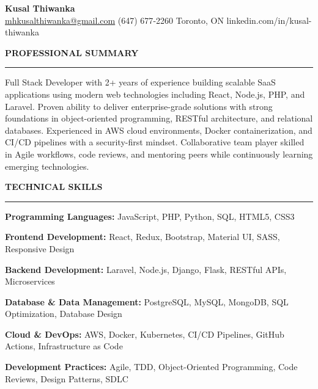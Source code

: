\documentclass[10pt,letterpaper]{article}
\begin{document}
\begin{center}
{\LARGE\textbf{Kusal Thiwanka}}\\[3pt]
\href{mailto:mhkusalthiwanka@gmail.com}{mhkusalthiwanka@gmail.com}\hspace{2em}%
(647) 677{-}2260\hspace{2em}%
Toronto, ON\hspace{2em}
linkedin.com/in/kusal-thiwanka
\end{center}

\vspace{6pt}

\textbf{PROFESSIONAL SUMMARY}\\[-8pt]
\noindent\rule{\textwidth}{1pt}

\vspace{-2pt}

Full Stack Developer with 2+ years of experience building scalable SaaS applications using modern web technologies including React, Node.js, PHP, and Laravel. Proven ability to deliver enterprise-grade solutions with strong foundations in object-oriented programming, RESTful architecture, and relational databases. Experienced in AWS cloud environments, Docker containerization, and CI/CD pipelines with a security-first mindset. Collaborative team player skilled in Agile workflows, code reviews, and mentoring peers while continuously learning emerging technologies.

\vspace{8pt}

\textbf{TECHNICAL SKILLS}\\[-8pt]
\noindent\rule{\textwidth}{1pt}

\vspace{-2pt}

\textbf{Programming Languages:} JavaScript, PHP, Python, SQL, HTML5, CSS3

\textbf{Frontend Development:} React, Redux, Bootstrap, Material UI, SASS, Responsive Design

\textbf{Backend Development:} Laravel, Node.js, Django, Flask, RESTful APIs, Microservices

\textbf{Database \& Data Management:} PostgreSQL, MySQL, MongoDB, SQL Optimization, Database Design

\textbf{Cloud \& DevOps:} AWS, Docker, Kubernetes, CI/CD Pipelines, GitHub Actions, Infrastructure as Code

\textbf{Development Practices:} Agile, TDD, Object-Oriented Programming, Code Reviews, Design Patterns, SDLC
\end{document}
